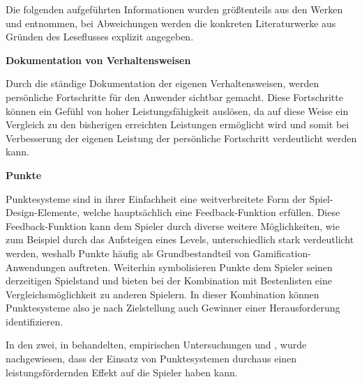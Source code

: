 \documentclass[bibliography=totoc,listof=totoc,BCOR=5mm,DIV=12,oneside]{scrbook}
\begin{document}
\par \bigskip Die folgenden aufgeführten Informationen wurden größtenteils aus den Werken \citep[Kapitel 2.2.2 Analyse einzelner Spiel-Design-Elemente]{Sailer2016} und \citep[Kapitel 4 The Gamification Toolkit Game Elements]{werbach2012win} entnommen, bei Abweichungen werden die konkreten Literaturwerke aus Gründen des Leseflusses explizit angegeben.

\par \bigskip \textbf{Dokumentation von Verhaltensweisen}
\par Durch die ständige Dokumentation der eigenen Verhaltensweisen, werden persönliche Fortschritte für den Anwender sichtbar gemacht. Diese Fortschritte können ein Gefühl von hoher Leistungsfähigkeit auslösen, da auf diese Weise ein Vergleich zu den bisherigen erreichten Leistungen ermöglicht wird und somit bei Verbesserung der eigenen Leistung der persönliche Fortschritt verdeutlicht werden kann.

\par \bigskip \textbf{Punkte}
\par Punktesysteme sind in ihrer Einfachheit eine weitverbreitete Form der Spiel-Design-Elemente, welche hauptsächlich eine Feedback-Funktion erfüllen. Diese Feedback-Funktion kann dem Spieler durch diverse weitere Möglichkeiten, wie zum Beispiel durch das Aufsteigen eines Levels, unterschiedlich stark verdeutlicht werden, weshalb Punkte häufig als Grundbestandteil von Gamification-Anwendungen auftreten. Weiterhin symbolisieren Punkte dem Spieler seinen derzeitigen Spielstand und bieten bei der Kombination mit Bestenlisten eine Vergleichsmöglichkeit zu anderen Spielern. In dieser Kombination können Punktesysteme also je nach Zielstellung auch Gewinner einer Herausforderung identifizieren.
\par In den zwei, in \citep{Sailer2016} behandelten, empirischen Untersuchungen \citep{mekler2013disassembling} und \citep{mekler2013points}, wurde nachgewiesen, dass der Einsatz von Punktesystemen durchaus einen leistungsfördernden Effekt auf die Spieler haben kann.
\end{document}
